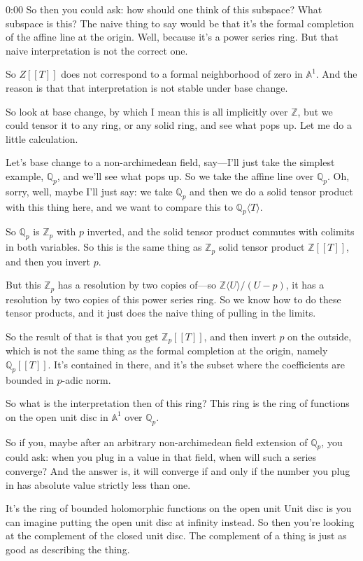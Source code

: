 \begin{unfinished}{0:00}
So then you could ask: how should one think of this subspace? What subspace is this? The naive thing to say would be that it's the formal completion of the affine line at the origin. Well, because it's a power series ring. But that naive interpretation is not the correct one.

So $Z[[T]]$ does not correspond to a formal neighborhood of zero in $\mathbb{A}^1$. And the reason is that that interpretation is not stable under base change.

So look at base change, by which I mean this is all implicitly over $\mathbb{Z}$, but we could tensor it to any ring, or any solid ring, and see what pops up. Let me do a little calculation.

Let's base change to a non-archimedean field, say---I'll just take the simplest example, $\mathbb{Q}_p$, and we'll see what pops up. So we take the affine line over $\mathbb{Q}_p$. Oh, sorry, well, maybe I'll just say: we take $\mathbb{Q}_p$ and then we do a solid tensor product with this thing here, and we want to compare this to $\mathbb{Q}_p\langle T\rangle$.

So $\mathbb{Q}_p$ is $\mathbb{Z}_p$ with $p$ inverted, and the solid tensor product commutes with colimits in both variables. So this is the same thing as $\mathbb{Z}_p$ solid tensor product $\mathbb{Z}[[T]]$, and then you invert $p$.

But this $\mathbb{Z}_p$ has a resolution by two copies of---so $\mathbb{Z}\langle U\rangle/(U-p)$, it has a resolution by two copies of this power series ring. So we know how to do these tensor products, and it just does the naive thing of pulling in the limits.

So the result of that is that you get $\mathbb{Z}_p[[T]]$, and then invert $p$ on the outside, which is not the same thing as the formal completion at the origin, namely $\mathbb{Q}_p[[T]]$. It's contained in there, and it's the subset where the coefficients are bounded in $p$-adic norm.

So what is the interpretation then of this ring? This ring is the ring of functions on the open unit disc in $\mathbb{A}^1$ over $\mathbb{Q}_p$.

So if you, maybe after an arbitrary non-archimedean field extension of $\mathbb{Q}_p$, you could ask: when you plug in a value in that field, when will such a series converge? And the answer is, it will converge if and only if the number you plug in has absolute value strictly less than one. 

It's the ring of bounded holomorphic functions on the open unit
Unit disc is you can imagine putting the open unit disc at infinity instead. So then you're looking at the complement of the closed unit disc. The complement of a thing is just as good as describing the thing.


\end{unfinished}
